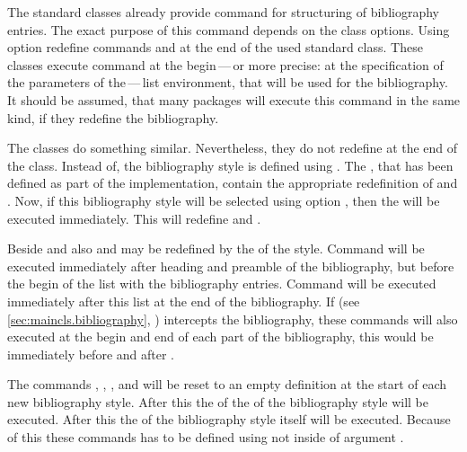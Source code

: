 \begin{Declaration}
\end{Declaration}
The standard classes already provide command
 for structuring of bibliography entries. The exact purpose of
this command depends on the class options. Using option
 redefine commands
 and  at the end of the used standard
class. These classes execute command  at the
begin\,---\,or more precise: at the specification of the parameters of
the\,---\,list environment, that will be used for the bibliography. It should
be assumed, that many packages will execute this command in the same kind, if
they redefine the bibliography.

The \KOMAScript{} classes do something similar. Nevertheless, they do not
redefine  at the end of the class. Instead of, the
bibliography style  is defined using
. The , that has been defined as part
of the implementation, contain the appropriate redefinition of
 and . Now, if this bibliography style
will be selected using option
%
%
, then the
 will be executed immediately. This will redefine
 and .

Beside  and  also 
and  may be redefined by the  of the
style. Command  will be executed immediately after
heading and preamble of the bibliography, but before the begin of the list
with the bibliography entries. Command  will be executed
immediately after this list at the end of the bibliography. If
 (see
\autoref{sec:maincls.bibliography},
) intercepts the bibliography,
these commands will also executed at the begin and end of each part of the
bibliography, this would be immediately before and after
.

The commands , , ,
and  will be reset to an empty definition at the start of
each new bibliography style. After this the  of the
 of the bibliography style will be executed. After this
the  of the bibliography style itself will be
executed. Because of this these commands has to be defined using
not  inside of argument .

